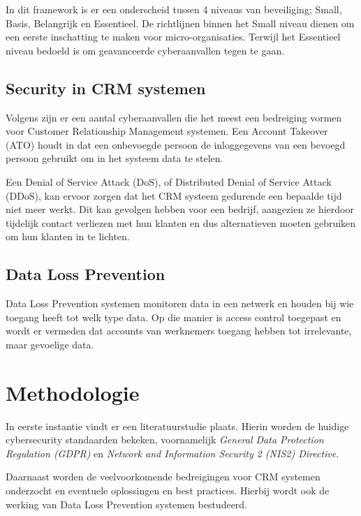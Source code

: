 In dit framework is er een onderscheid tussen 4 niveaus van beveiliging; Small, Basis, Belangrijk en Essentieel. De richtlijnen binnen het Small niveau dienen om een eerste inschatting te maken voor micro-organisaties. Terwijl het Essentieel niveau bedoeld is om geavanceerde cyberaanvallen tegen te gaan. \autocite{FUNDAMENTALS2023a}

\subsection{Security in CRM systemen}
Volgens \textcite{CRMSecurity} zijn er een aantal cyberaanvallen die het meest een bedreiging vormen voor Customer Relationship Management systemen. \newline
Een Account Takeover (ATO) houdt in dat een onbevoegde persoon de inloggegevens van een bevoegd persoon gebruikt om in het systeem data te stelen. \newline

Een Denial of Service Attack (DoS), of Distributed Denial of Service Attack (DDoS), kan ervoor zorgen dat het CRM systeem gedurende een bepaalde tijd niet meer werkt. Dit kan gevolgen hebben voor een bedrijf, aangezien ze hierdoor tijdelijk contact verliezen met hun klanten en dus alternatieven moeten gebruiken om hun klanten in te lichten.

\subsection{Data Loss Prevention}
Data Loss Prevention systemen monitoren data in een netwerk en houden bij wie toegang heeft tot welk type data. Op die manier is access control toegepast en wordt er vermeden dat accounts van werknemers toegang hebben tot irrelevante, maar gevoelige data.

\section{Methodologie}%
\label{sec:methodologie}

In eerste instantie vindt er een literatuurstudie plaats. Hierin worden de huidige cybersecurity standaarden bekeken, voornamelijk \emph{General Data Protection Regulation (GDPR)} en \emph{Network and Information Security 2 (NIS2) Directive}. \newline

Daarnaast worden de veelvoorkomende bedreigingen voor CRM systemen onderzocht en eventuele oplossingen en best practices. Hierbij wordt ook de werking van Data Loss Prevention systemen bestudeerd.

